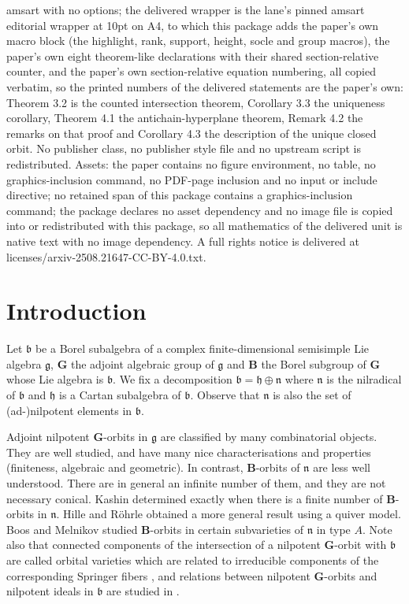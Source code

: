 \documentclass[10pt,a4paper]{amsart}
\newcommand{\group}[1]{\mathbf{#1}}
\numberwithin{equation}{section}
\theoremstyle{plain}
\theoremstyle{definition}
\theoremstyle{remark}
\begin{document}
amsart with no options; the delivered wrapper is the lane's pinned amsart editorial wrapper at 10pt on A4, to which this package adds the paper's own macro block (the highlight, rank, support, height, socle and group macros), the paper's own eight theorem-like declarations with their shared section-relative counter, and the paper's own section-relative equation numbering, all copied verbatim, so the printed numbers of the delivered statements are the paper's own: Theorem 3.2 is the counted intersection theorem, Corollary 3.3 the uniqueness corollary, Theorem 4.1 the antichain-hyperplane theorem, Remark 4.2 the remarks on that proof and Corollary 4.3 the description of the unique closed orbit. No publisher class, no publisher style file and no upstream script is redistributed. Assets: the paper contains no figure environment, no table, no graphics-inclusion command, no PDF-page inclusion and no input or include directive; no retained span of this package contains a graphics-inclusion command; the package declares no asset dependency and no image file is copied into or redistributed with this package, so all mathematics of the delivered unit is native text with no image dependency. A full rights notice is delivered at licenses/arxiv-2508.21647-CC-BY-4.0.txt.
\section{Introduction}

Let $\mathfrak{b}$ be a Borel subalgebra of a complex finite-dimensional semisimple Lie algebra 
$\mathfrak{g}$, $\group{G}$ the adjoint algebraic group of $\mathfrak{g}$ and $\group{B}$ the 
Borel subgroup of $\group{G}$ whose Lie algebra is $\mathfrak{b}$.
We fix a decomposition $\mathfrak{b} = \mathfrak{h}\oplus \mathfrak{n}$ where $\mathfrak{n}$
is the nilradical of $\mathfrak{b}$ and $\mathfrak{h}$ is a Cartan subalgebra of $\mathfrak{b}$.
Observe that $\mathfrak{n}$ is also the set of (ad-)nilpotent elements in $\mathfrak{b}$.

Adjoint nilpotent $\group{G}$-orbits in $\mathfrak{g}$ are classified by many combinatorial objects. 
They are well studied,
and have many nice characterisations and properties (finiteness, algebraic and geometric). In contrast, 
$\group{B}$-orbits of $\mathfrak{n}$ are less well understood. There are in general an infinite number
of them, and they are not necessary conical. Kashin \cite{K} determined exactly when there is a 
finite number of $\group{B}$-orbits in $\mathfrak{n}$. Hille and R\"ohrle \cite{HR} obtained a more
general result using a quiver model. Boos \cite{B} and Melnikov \cite{M1} studied $\group{B}$-orbits 
in certain subvarieties
of $\mathfrak{n}$ in type $A$. Note also that
connected components of the intersection of a nilpotent $\group{G}$-orbit with $\mathfrak{b}$ are called 
orbital varieties which are related to irreducible components of the corresponding Springer 
fibers \cite{S,FM}, and relations between nilpotent $\group{G}$-orbits and nilpotent ideals in 
$\mathfrak{b}$ are studied in \cite{So2}.
\end{document}
